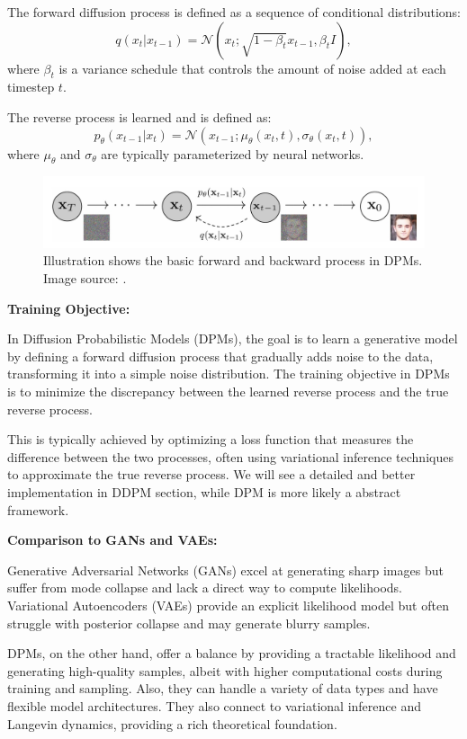 \documentclass[sigconf,natbib=false]{acmart}
\begin{document}
The forward diffusion process is defined as a sequence of conditional distributions:
\[
q(x_t | x_{t-1}) = \mathcal{N}(x_t; \sqrt{1 - \beta_t} x_{t-1}, \beta_t I),
\]
where \(\beta_t\) is a variance schedule that controls the amount of noise added at each timestep \(t\).

The reverse process is learned and is defined as:
\[
p_\theta(x_{t-1} | x_t) = \mathcal{N}(x_{t-1}; \mu_\theta(x_t, t), \sigma_\theta(x_t, t)),
\]
where \(\mu_\theta\) and \(\sigma_\theta\) are typically parameterized by neural networks.

\begin{figure}[h]
  \centering
  \includegraphics[width=\linewidth]{imgs/200611239-F2.png}
  \caption{Illustration shows the basic forward and backward process in DPMs.
  Image source: \cite[Ho et al. (2020)]{ho2020}.}
  \Description{}
\end{figure}

\textbf{Training Objective:}

In Diffusion Probabilistic Models (DPMs),
the goal is to learn a generative model by defining a forward diffusion process
that gradually adds noise to the data, transforming it into a simple noise distribution.
The training objective in DPMs is to minimize the discrepancy
between the learned reverse process and the true reverse process.

This is typically achieved by optimizing a loss function
that measures the difference between the two processes,
often using variational inference techniques to approximate the true reverse process.
We will see a detailed and better implementation in DDPM section,
while DPM is more likely a abstract framework.

\textbf{Comparison to GANs and VAEs:}

Generative Adversarial Networks (GANs) excel at generating sharp images
but suffer from mode collapse and lack a direct way to compute likelihoods.
Variational Autoencoders (VAEs) provide an explicit likelihood model
but often struggle with posterior collapse and may generate blurry samples.

DPMs, on the other hand, offer a balance by providing a tractable likelihood
and generating high-quality samples,
albeit with higher computational costs during training and sampling.
Also, they can handle a variety of data types and have flexible model architectures.
They also connect to variational inference and Langevin dynamics,
providing a rich theoretical foundation. \cite{welling2011}
\end{document}
